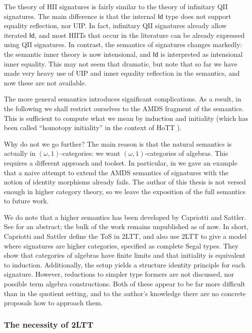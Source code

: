 \documentclass[12pt,a4paper,twoside,openany]{book}
\theoremstyle{remark}
\theoremstyle{definition}
\theoremstyle{theorem}
\newcommand{\Id}{\mathsf{Id}}
\begin{document}
The theory of HII signatures is fairly similar to the theory of infinitary QII
signatures. The main difference is that the internal $\Id$ type does not support
equality reflection, nor UIP. In fact, infinitary QII signatures already allow
iterated $\Id$, and most HIITs that occur in the literature can be already
expressed using QII signatures. In contrast, the semantics of signatures changes
markedly: the semantic inner theory is now intensional, and $\Id$ is interpreted
as intensional inner equality. This may not seem that dramatic, but note that so
far we have made very heavy use of UIP and inner equality reflection in the
semantics, and now these are not available.

The more general semantics introduces significant complications. As a result, in
the following we shall restrict ourselves to the AMDS fragment of the semantics.
This is sufficient to compute what we mean by induction and initiality (which
has been called ``homotopy initiality'' in the context of HoTT
\cite{homotopy-initial}).

Why do not we go further? The main reason is that the natural semantics is
actually in $(\omega,1)$-categories: we want $(\omega,1)$-categories of
algebras. This requires a different approach and toolset. In particular, in
\cite[Section~9]{hiits} we gave an example that a naive attempt to extend the AMDS
semantics of signatures with the notion of identity morphisms already fails.
The author of this thesis is not versed enough in higher category theory, so we
leave the exposition of the full semantics to future work.

We do note that a higher semantics has been developed by Capriotti and
Sattler. See \cite{capriotti2020higher} for an abstract; the bulk of the work
remains unpublished as of now. In short, Capriotti and Sattler define the ToS in
2LTT, and also use 2LTT to give a model where signatures are higher categories,
specified as complete Segal types. They show that categories of algebras have
finite limits and that initiality is equivalent to induction. Additionally, the
setup yields a structure identity principle for each signature. However,
reductions to simpler type formers are not discussed, nor possible term algebra
constructions. Both of these appear to be far more difficult than in the
quotient setting, and to the author's knowledge there are no concrete proposals
how to approach them.

\subsubsection{The necessity of 2LTT}
\end{document}
